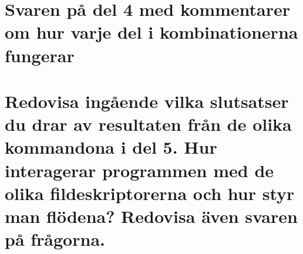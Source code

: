 \documentclass[11pt]{article}
\begin{document}
\section{Svaren på del 4 med kommentarer om hur varje del i kombinationerna fungerar}
\lipsum[56]

\section{Redovisa ingående vilka slutsatser du drar av resultaten från de olika kommandona i del 5. Hur interagerar programmen med de olika fildeskriptorerna och hur styr man flödena? Redovisa även svaren på frågorna.}
\lipsum[56]
\end{document}
